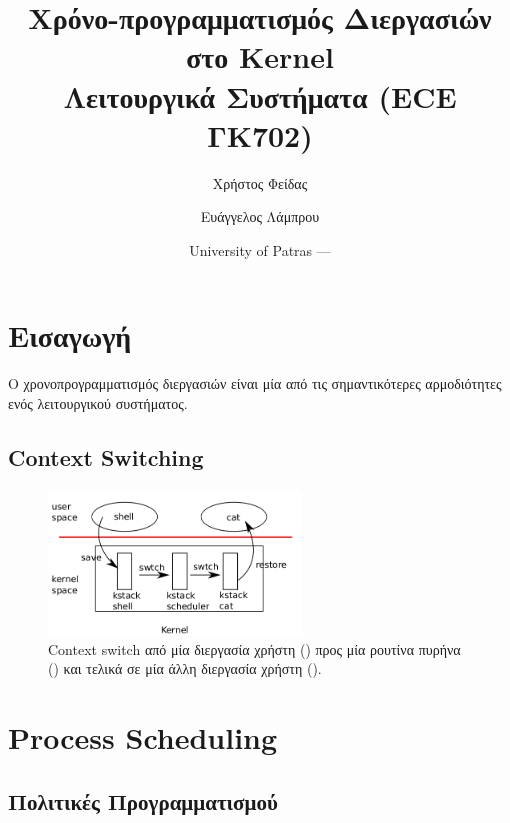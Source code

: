 \documentclass[18pt]{extarticle}
\title{Χρόνο-προγραμματισμός Διεργασιών στο \src{xv6} Kernel \\Λειτουργικά Συστήματα (ECE ΓΚ702)} %
\author{\footnotesize Χρήστος Φείδας\\ \footnotesize \src{fidas@upatras.gr} \and \footnotesize Ευάγγελος Λάμπρου\\ \footnotesize \src{e.lamprou@upnet.gr}} %
\date{University of Patras --- \the\year{}} %
\begin{document}
\pagestyle{fancy}
\fancyhf{} %
\renewcommand{\headrulewidth}{0pt}
\fancyhead{} %
\fancyfoot{} %
\fancyfoot[R]{\thepage}

\maketitle

\tableofcontents


\section{Εισαγωγή}

Ο χρονοπρογραμματισμός διεργασιών είναι μία από τις σημαντικότερες 
αρμοδιότητες ενός λειτουργικού συστήματος.

\subsection{Context Switching}

\begin{figure}[H]
    \centering
    \includegraphics[width=0.6\textwidth]{assets/sched/switch.png}
    \caption{Context switch από μία διεργασία χρήστη () 
    προς μία ρουτίνα πυρήνα () και τελικά 
    σε μία άλλη διεργασία χρήστη ().}
\end{figure}

\section{Process Scheduling}

\subsection{Πολιτικές Προγραμματισμού}
\end{document}
